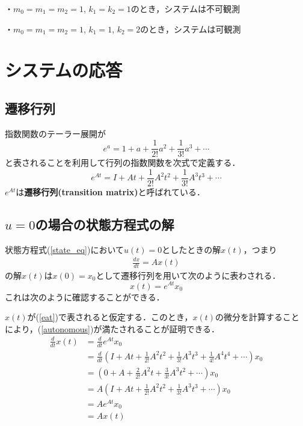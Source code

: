 ・$m_0=m_1=m_2=1$, $k_1=k_2=1$のとき，システムは不可観測

・$m_0=m_1=m_2=1$, $k_1=1$, $k_2=2$のとき，システムは可観測


\section{システムの応答}

\subsection{遷移行列}

指数関数のテーラー展開が
\begin{equation}
	e^{a} = 1 + a + \frac{1}{2!} a^2 
        + \frac{1}{3!} a^3  + \cdots
\end{equation}
と表されることを利用して行列の指数関数を次式で定義する．
\begin{equation}
 e^{At} = I + At + \frac{1}{2!} A^2 t^2 
        + \frac{1}{3!} A^3 t^3 + \cdots
\end{equation}
$e^{At}$は{\bf {遷移行列}(transition matrix)}と呼ばれている．

\subsection{$u=0$の場合の状態方程式の解}
状態方程式(\ref{state_eq})において$u(t) = 0$としたときの解$x(t)$，つまり
\begin{align}
\frac{dx}{dt} = Ax(t) \label{autonomous}
\end{align}
の解$x(t)$は$x(0)=x_0$として遷移行列を用いて次のように表わされる．
\begin{equation}
 x(t) = e^{At} x_0 \label{eat}
\end{equation}
これは次のように確認することができる．

$x(t)$が(\ref{eat})で表されると仮定する．このとき，$x(t)$の微分を計算することにより，(\ref{autonomous})が満たされることが証明できる．
\begin{align}
 \frac{d}{dt}x(t)
 &= \frac{d}{dt}e^{At} x_0 \\
 &= \frac{d}{dt}
 \left(I + At + \frac{1}{2!} A^2 t^2 + \frac{1}{3!} A^3 t^3 + 
 \frac{1}{4!} A^4 t^4 + \cdots\right)x_0 \nonumber \\
 &= \left(0 + A + \frac{2}{2!} A^2 t + \frac{3}{3!} A^3 t^2 +
 \cdots\right)x_0 \nonumber \\
 &= A 
 \left(I + At + \frac{1}{2!} A^2 t^2 + \frac{1}{3!} A^3 t^3 + \cdots
 \right)x_0 \nonumber \\
 &= A e^{At} x_0 \nonumber \\
 &= Ax(t)
\end{align}


